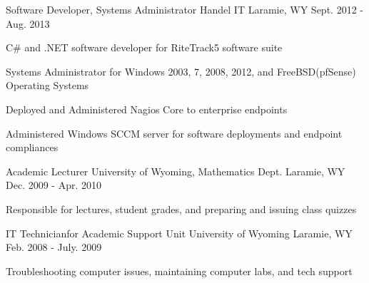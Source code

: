 \begin{cventries}
\begin{displaySection}
    \cventry
    {Software Developer, Systems Administrator} %
    {Handel IT} %
    {Laramie, WY} %
    {Sept. 2012 - Aug. 2013} %
    { %
    \begin{cvitems}
    \item {C\# and .NET software developer for RiteTrack5 software suite}
    \item {Systems Administrator for Windows 2003, 7, 2008, 2012, and FreeBSD(pfSense) Operating Systems}
    \item {Deployed and Administered Nagios Core to enterprise endpoints}
    \item {Administered Windows SCCM server for software deployments and endpoint compliances}
    \end{cvitems} 
    }

    \cventry
    {Academic Lecturer} %
    {University of Wyoming, Mathematics Dept.} %
    {Laramie, WY} %
    {Dec. 2009 - Apr. 2010} %
    { %
    \begin{cvitems}
    \item {Responsible for lectures, student grades, and preparing and issuing class quizzes}
    \end{cvitems}
    }


    \cventry
    {IT Technicianfor Academic Support Unit} %
    {University of Wyoming} %
    {Laramie, WY} %
    {Feb. 2008 - July. 2009} %
    { %
    \begin{cvitems}
    \item {Troubleshooting computer issues, maintaining computer labs, and tech support}
    \end{cvitems}
    }

\end{displaySection}

\end{cventries}
